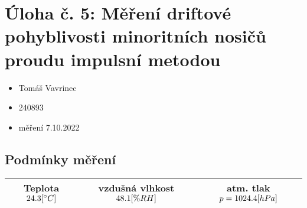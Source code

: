 \documentclass{article}
\begin{document}
\section*{Úloha č. 5: Měření driftové pohyblivosti minoritních nosičů proudu impulsní metodou}
\begin{itemize}
    \item Tomáš Vavrinec
    \item 240893
    \item měření 7.10.2022
\end{itemize}

\subsection*{Podmínky měření}

\begin{tabular}{|c|c|c|}
    \hline
    Teplota \(24.3\-[^\circ C]\) & vzdušná vlhkost \(48.1\-[\%RH]\) & atm. tlak \(p = 1024.4\-[hPa]\) \\ \hline
\end{tabular}
\end{document}
